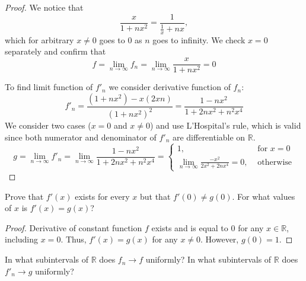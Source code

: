 \documentclass{article}
\begin{document}
\begin{proof}

We notice that
\[ \frac{x}{1 + nx^2} = \frac{1}{\frac{1}{x}+nx}, \]
which for arbitrary $x \neq 0$ goes to $0$ as $n$ goes to infinity.
We check $x=0$ separately and confirm that
\[ f = \lim_{n\to\infty} f_n = \lim_{n\to\infty} \frac{x}{1 + nx^2} = 0 \]

To find limit function of $f'_n$ we consider derivative function of $f_n$:
\[ f'_n = \frac{(1+nx^2) - x (2xn)}{(1+nx^2)^2} = \frac{1-nx^2}{1+2nx^2+n^2x^4} \]
We consider two cases ($x=0$ and $x\neq0$) and use L'Hospital's rule, which is valid since both numerator and denominator of $f'_n$ are differentiable on $\mathbb{R}$.
\[
    g
    = \lim_{n\to\infty } f'_n 
    = \lim_{n\to\infty } \frac{1-nx^2}{1+2nx^2+n^2x^4} 
    =
    \begin{cases}
        1, & \text{ for $x = 0$} \\
        \lim_{n\to\infty} \frac{-x^2}{2x^2+2nx^4} = 0, & \text{ otherwise}
    \end{cases}
\]

\end{proof}

\begin{tcolorbox}
Prove that $f'(x)$ exists for every $x$ but that $f'(0) \neq g(0)$. For what values of $x$ is $f'(x) = g(x)$? 
\end{tcolorbox}

\begin{proof}

Derivative of constant function $f$ exists and is equal to $0$ for any $x \in \mathbb{R}$, including $x=0$.
Thus, $f'(x) = g(x)$ for any $x\neq0$. However, $g(0)=1$.

\end{proof}

\begin{tcolorbox}
In what subintervals of $\mathbb{R}$ does $f_n \to f$ uniformly?
In what subintervals of $\mathbb{R}$ does $f'_n \to g$ uniformly?
\end{tcolorbox}
\end{document}
